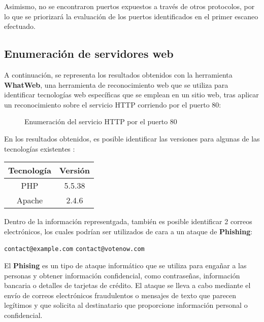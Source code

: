 \documentclass[a4paper]{article} %
\begin{document}
  \justifying %

  Asimismo, no se encontraron puertos expuestos a través de otros protocolos, por lo que se 
  priorizará la evaluación de los puertos identificados en el primer escaneo efectuado. 
  \clearpage
  \subsection{Enumeración de servidores web}

  A continuación, se representa los resultados obtenidos con la herramienta \textbf{WhatWeb},
  una herramienta de reconocimiento web que se utiliza para identificar tecnologías web específicas
  que se emplean en un sitio web, tras aplicar un reconocimiento sobre el servicio HTTP corriendo por el 
  puerto 80:
 
  \begin{figure}[h]
    \centering
    \setlength{\fboxrule}{0.8pt}
    \caption{Enumeración del servicio HTTP por el puerto 80}
  \end{figure}

  En los resultados obtenidos, es posible identificar las versiones para algunas de las tecnologías existentes : 

  \vspace{0.4cm}
  \centering 
  \begin{tabular}{ c | c }
    \textbf{Tecnología} & \textbf{Versión} \\
    \hline 
    PHP & 5.5.38 \\ 
    Apache & 2.4.6
      
  \end{tabular}
  \vspace{0.4cm}
  \justifying

  Dentro de la información representgada, también es posible identificar 2 correos electrónicos, los cuales 
  podrían ser utilizados de cara a un ataque de \textbf{Phishing}:

  \vspace{0.3cm}
  \begin{center}
    \texttt{contact@example.com} \qquad \texttt{contact@votenow.com}
  \end{center}
  \vspace{0.3cm}

  El \textbf{Phising} es un tipo de ataque informático que se utiliza para engañar a las personas y obtener 
  información confidencial, como contraseñas, información bancaria o detalles de tarjetas de crédito. El ataque
  se lleva a cabo mediante el envío de correos electrónicos fraudulentos o mensajes de texto que parecen 
  legítimos y que solicita al destinatario que proporcione información personal o confidencial.
\end{document}
